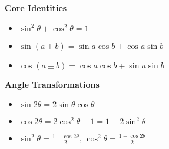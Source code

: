 \documentclass{article}
\begin{document}
\begin{tcolorbox}[colframe=black,colback=white,boxrule=0.3pt,arc=1pt,
left=0pt,right=0pt,top=0pt,bottom=0pt]
\begin{minipage}[t]{0.49\textwidth}
\begin{itemize}
\begin{minipage}[t]{0.45\textwidth}
    \textbf{Core Identities}
    \begin{itemize}
        \item $\sin^2\theta + \cos^2\theta = 1$
        \item $\sin(a\pm b) = \sin a\cos b \pm \cos a\sin b$
        \item $\cos(a\pm b) = \cos a\cos b \mp \sin a\sin b$
    \end{itemize}
\end{minipage}
\hfill
\begin{minipage}[t]{0.45\textwidth}
    \textbf{Angle Transformations}
    \begin{itemize}
        \item $\sin 2\theta = 2\sin\theta\cos\theta$
        \item $\cos 2\theta = 2\cos^2\theta - 1 = 1 - 2\sin^2\theta$
        \item $\sin^2\theta = \frac{1-\cos2\theta}{2}$, $\cos^2\theta = \frac{1+\cos2\theta}{2}$
    \end{itemize}
\end{minipage}


\end{itemize}
\end{minipage}
\end{tcolorbox}
\end{document}
